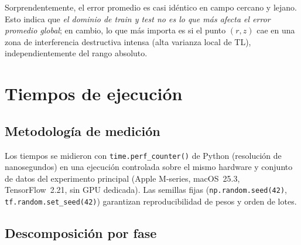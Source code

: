 \documentclass[12pt,a4paper]{article}
\begin{document}
Sorprendentemente, el error promedio es casi idéntico en campo cercano y
lejano. Esto indica que \emph{el dominio de train y test no es lo que más
afecta el error promedio global}; en cambio, lo que más importa es si el punto
$(r,z)$ cae en una zona de interferencia destructiva intensa (alta varianza
local de TL), independientemente del rango absoluto.

\section{Tiempos de ejecución}
\label{sec:tiempos}

\subsection{Metodología de medición}

Los tiempos se midieron con \texttt{time.perf\_counter()} de Python
(resolución de nanosegundos) en una ejecución controlada sobre el mismo
hardware y conjunto de datos del experimento principal
(Apple M-series, macOS~25.3, TensorFlow~2.21, sin GPU dedicada).
Las semillas fijas (\texttt{np.random.seed(42)}, \texttt{tf.random.set\_seed(42)})
garantizan reproducibilidad de pesos y orden de lotes.

\subsection{Descomposición por fase}
\end{document}
